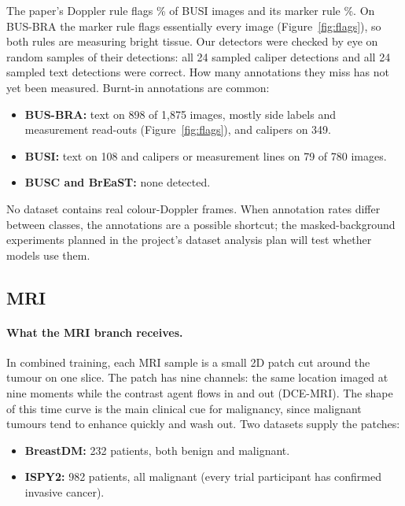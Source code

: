 \documentclass[11pt]{article}
\begin{document}
The paper's Doppler rule flags \busiPaperDoppler\% of BUSI images and its
marker rule \busiPaperMarker\%. On BUS-BRA the marker rule flags essentially
every image (Figure~\ref{fig:flags}), so both rules are measuring bright
tissue. Our detectors were checked by eye on random samples of their
detections: all 24 sampled caliper detections and all 24 sampled text
detections were correct. How many annotations they miss has not yet been
measured. Burnt-in annotations are common:
\begin{itemize}
  \item \textbf{BUS-BRA:} text on 898 of 1,875 images, mostly side labels and
  measurement read-outs (Figure~\ref{fig:flags}), and calipers on 349.
  \item \textbf{BUSI:} text on 108 and calipers or measurement lines on 79 of
  780 images.
  \item \textbf{BUSC and BrEaST:} none detected.
\end{itemize}
No dataset contains real colour-Doppler frames. When annotation rates differ
between classes, the annotations are a possible shortcut; the
masked-background experiments planned in the project's dataset analysis plan
will test whether models use them.

\subsection{MRI}

\paragraph{What the MRI branch receives.} In combined training, each MRI
sample is a small 2D patch cut around the tumour on one slice. The patch has
nine channels: the same location imaged at nine moments while the contrast
agent flows in and out (DCE-MRI). The shape of this time curve is the main
clinical cue for malignancy, since malignant tumours tend to enhance quickly
and wash out. Two datasets supply the patches:
\begin{itemize}
  \item \textbf{BreastDM:} 232 patients, both benign and malignant.
  \item \textbf{ISPY2:} 982 patients, all malignant (every trial participant
  has confirmed invasive cancer).
\end{itemize}
\end{document}
